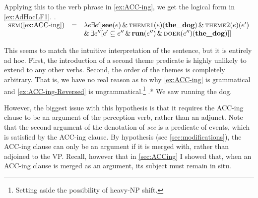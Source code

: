 \documentclass[MilwayThesis]{subfiles}
\begin{document}
Applying this to the verb phrase in \cref{ex:ACC-ing}, we get the logical form in \cref{ex:AdHocLF1}.
\ex.\label{ex:AdHocLF1}
$
\begin{array}[t]{rcl}
	\textsc{sem}(\text{\cref{ex:ACC-ing}}) & = & \lambda e \exists e^{\prime} [ \textbf{see}(e) \,\&\, \textsc{theme1}(e)(\textbf{the\_dog}) \,\&\, \textsc{theme2}(e)(e^{\prime})\\
	& & \&\, \exists e^{\prime\prime}[ e^{\prime} \subseteq e^{\prime\prime} \,\&\, \textbf{run}(e^{\prime\prime}) \,\&\, \textsc{doer}(e^{\prime\prime})(\textbf{the\_dog})]]
\end{array}
$

This seems to match the intuitive interpretation of the sentence, but it is entirely ad hoc.
First, the introduction of a second theme predicate is highly unlikely to extend to any other verbs.
Second, the order of the themes is completely arbitrary.
That is, we have no real reason as to why \cref{ex:ACC-ing} is grammatical and \cref{ex:ACC-ing-Reversed} is ungrammatical.\footnote{Setting aside the possibility of heavy-NP shift.}
\ex.* We saw running the dog.

However, the biggest issue with this hypothesis is that it requires the ACC-ing clause to be an argument of the perception verb, rather than an adjunct.
Note that the second argument of the denotation of \textit{see} is a predicate of events, which is satisfied by the ACC-ing clause.
By hypothesis (see \cref{sec:modifications}), the ACC-ing clause can only be an argument if it is merged with, rather than adjoined to the VP.
Recall, however that in \cref{sec:ACCing} I showed that, when an ACC-ing clause is merged as an argument, its subject must remain in situ.
\end{document}

